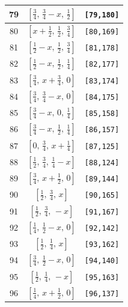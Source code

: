 \documentclass[fleqn,8pt]{jsarticle}
\begin{document}
\begin{longtable}{ccc}
79 & $\left[ \frac{3}{4},\, \frac{3}{4} - x,\, \frac{1}{2} \right]$ & {\tt [79,180]} \\ \hline
80 & $\left[ x + \frac{1}{2},\, \frac{1}{2},\, \frac{3}{4} \right]$ & {\tt [80,169]} \\ \hline
81 & $\left[ \frac{1}{2} - x,\, \frac{1}{2},\, \frac{3}{4} \right]$ & {\tt [81,178]} \\ \hline
82 & $\left[ \frac{1}{2} - x,\, \frac{1}{2},\, \frac{1}{4} \right]$ & {\tt [82,177]} \\ \hline
83 & $\left[ \frac{3}{4},\, x + \frac{3}{4},\, 0 \right]$ & {\tt [83,174]} \\ \hline
84 & $\left[ \frac{3}{4},\, \frac{3}{4} - x,\, 0 \right]$ & {\tt [84,175]} \\ \hline
85 & $\left[ \frac{3}{4} - x,\, 0,\, \frac{1}{4} \right]$ & {\tt [85,158]} \\ \hline
86 & $\left[ \frac{3}{4} - x,\, \frac{1}{2},\, \frac{1}{4} \right]$ & {\tt [86,157]} \\ \hline
87 & $\left[ 0,\, \frac{3}{4},\, x + \frac{1}{4} \right]$ & {\tt [87,125]} \\ \hline
88 & $\left[ \frac{1}{2},\, \frac{3}{4},\, \frac{1}{4} - x \right]$ & {\tt [88,124]} \\ \hline
89 & $\left[ \frac{3}{4},\, x + \frac{1}{2},\, 0 \right]$ & {\tt [89,144]} \\ \hline
90 & $\left[ \frac{1}{2},\, \frac{3}{4},\, x \right]$ & {\tt [90,165]} \\ \hline
91 & $\left[ \frac{1}{2},\, \frac{3}{4},\, - x \right]$ & {\tt [91,167]} \\ \hline
92 & $\left[ \frac{1}{4},\, \frac{1}{2} - x,\, 0 \right]$ & {\tt [92,142]} \\ \hline
93 & $\left[ \frac{1}{2},\, \frac{1}{4},\, x \right]$ & {\tt [93,162]} \\ \hline
94 & $\left[ \frac{3}{4},\, \frac{1}{2} - x,\, 0 \right]$ & {\tt [94,140]} \\ \hline
95 & $\left[ \frac{1}{2},\, \frac{1}{4},\, - x \right]$ & {\tt [95,163]} \\ \hline
96 & $\left[ \frac{1}{4},\, x + \frac{1}{2},\, 0 \right]$ & {\tt [96,137]} \\
\end{longtable}
\renewcommand{\arraystretch}{1.2}
\end{document}
